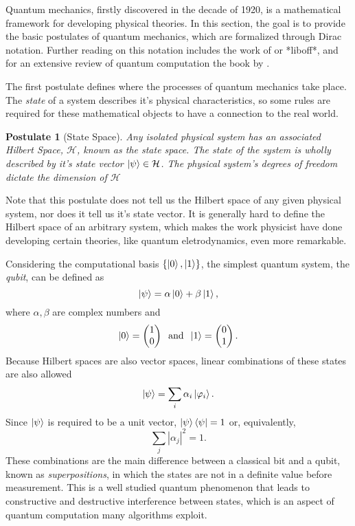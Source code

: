 \documentclass[../../dissertation.tex]{subfiles}
\newtheorem{post}{Postulate}
\begin{document}
Quantum mechanics, firstly discovered in the decade of 1920, is a mathematical
framework for developing physical theories. In this section, the goal is to
provide the basic postulates of quantum mechanics, which are formalized through
Dirac notation. Further reading on this notation includes the work of
\cite{sakurai1994} or *liboff*, and for an extensive review of quantum computation the
book by \cite{nielsen2011}.\par  
The first postulate defines where the processes of quantum mechanics take
place. The \textit{state} of a system describes it's physical characteristics,
so some rules are required for these mathematical objects to have a connection
to the real world.
\begin{post}[State Space] 
	Any isolated physical system has an associated Hilbert Space,
	$\mathcal{H}$, known as the state space. The state of the system is
	wholly described by it's state vector $\ket{\psi} \in \mathcal{H}$. The
	physical system's degrees of freedom dictate the dimension of
	$\mathcal{H}$\par
\end{post}
Note that this postulate does not tell us the Hilbert space of any given
physical system, nor does it tell us it's state vector. It is generally hard to
define the Hilbert space of an arbitrary system, which makes the work physicist
have done developing certain theories, like quantum eletrodynamics, even more
remarkable.\par 
Considering the computational basis $\{\ket{0},\ket{1}\}$, the simplest quantum
system, the \textit{qubit}, can be defined as 
\begin{equation}
	\ket{\psi} = \alpha \ket{0} + \beta \ket{1},
\end{equation}
where $\alpha,\beta$ are complex numbers and
\begin{equation}
	\ket{0} = \begin{pmatrix} 1 \\0 \end{pmatrix}  \; \; \text{and}  \;  \;  \ket{1} = \begin{pmatrix} 0 \\1 \end{pmatrix}.
\end{equation}
Because Hilbert spaces are also vector spaces, linear combinations of these
states are also allowed 
\begin{equation}
	\ket{\psi} = \sum_i \alpha_i \ket{\varphi_i}.
\end{equation}
Since $\ket{\psi}$ is required to be a unit vector, $\ket{\psi}\bra{\psi}=1$ or, equivalently,
\begin{equation}
	\sum_j | \alpha_j |^2 = 1 .
\end{equation}
These combinations are the main difference between a classical bit and a qubit,
known as \textit{superpositions}, in which the states are not in a definite
value before measurement. This is a well studied quantum phenomenon that leads
to constructive and destructive interference between states, which is an aspect
of quantum computation many algorithms exploit.\par
\end{document}
